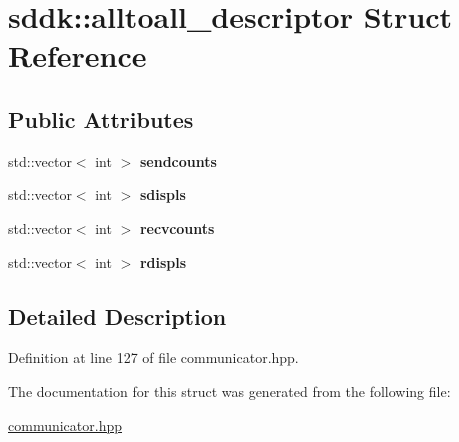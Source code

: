 \hypertarget{structsddk_1_1alltoall__descriptor}{}\section{sddk\+:\+:alltoall\+\_\+descriptor Struct Reference}
\label{structsddk_1_1alltoall__descriptor}
\subsection*{Public Attributes}
\begin{DoxyCompactItemize}
\item 
\hypertarget{structsddk_1_1alltoall__descriptor_a01216366b51c61e3cfa2cf77b5e5e63e}{}std\+::vector$<$ int $>$ {\bfseries sendcounts}\label{structsddk_1_1alltoall__descriptor_a01216366b51c61e3cfa2cf77b5e5e63e}

\item 
\hypertarget{structsddk_1_1alltoall__descriptor_a3c4046b141fd18e3fb19d0cbfe9649f5}{}std\+::vector$<$ int $>$ {\bfseries sdispls}\label{structsddk_1_1alltoall__descriptor_a3c4046b141fd18e3fb19d0cbfe9649f5}

\item 
\hypertarget{structsddk_1_1alltoall__descriptor_a7ef5ee9528a9037bd67859d692a57972}{}std\+::vector$<$ int $>$ {\bfseries recvcounts}\label{structsddk_1_1alltoall__descriptor_a7ef5ee9528a9037bd67859d692a57972}

\item 
\hypertarget{structsddk_1_1alltoall__descriptor_ab075c8a03ef67b79dd5cb140ee547099}{}std\+::vector$<$ int $>$ {\bfseries rdispls}\label{structsddk_1_1alltoall__descriptor_ab075c8a03ef67b79dd5cb140ee547099}

\end{DoxyCompactItemize}


\subsection{Detailed Description}


Definition at line 127 of file communicator.\+hpp.



The documentation for this struct was generated from the following file\+:\begin{DoxyCompactItemize}
\item 
\hyperlink{communicator_8hpp}{communicator.\+hpp}\end{DoxyCompactItemize}
